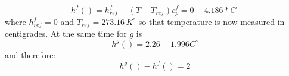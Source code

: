 \begin{equation}
h^f() = h^f_{ref} -(T-T_{ref})c_p^f = 0 - 4.186*  C^\circ   
\end{equation}
where \(h_{ref}^f=0\) and \(T_{ref} = 273.16\, K^\circ\) so that temperature is now measured in centigrades.
At the same time for \(g\) is 
\begin{equation}
h^g( ) = 2.26  - 1.996 C^\circ
\end{equation}
and therefore:
\begin{equation}
h^g()-h^f() = 2
\end{equation}